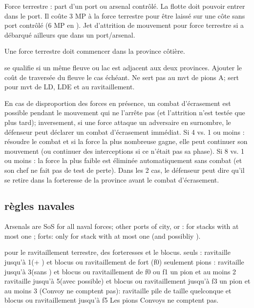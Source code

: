 Force terrestre : part d'un port ou arsenal
contrôlé.  La flotte doit pouvoir entrer dans le port.
\bparag Il coûte 3 MP à la force terrestre pour être laissé sur une côte
sans port contrôlé (6 MP en \ROTW).
\bparag Jet d'attrition de mouvement pour force terrestre si a débarqué
ailleurs que dans un port/arsenal.

Une force terrestre doit commencer dans la province côtière.

se qualifie si un même fleuve ou lac est adjacent
aux deux provinces. Ajouter le coût de traversée du
fleuve le cas échéant.
\bparag Ne sert pas au mvt de pions A; sert pour mvt de LD, LDE
et au ravitaillement.

En cas de disproportion des forces en présence, un combat d'écrasement est possible
pendant le mouvement qui ne l'arrête pas (et l'attrition n'est testée que plus tard);
inversement, si une force attaque un adversaire en surnombre, le défenseur
peut déclarer un combat d'écrasement immédiat.
\bparag Si 4 \LD vs. 1 \LD ou moins :  résoudre le combat et si la force la
plus nombreuse gagne, elle peut continuer son mouvement (ou continuer des
interceptions si ce n'était pas sa phase).
\bparag Si 8 \LD vs. 1 \LD ou moins : la force la plus faible est éliminée automatiquement
sans combat (et son chef ne fait pas de test de perte).
\bparag Dans les 2 cas, le défenseur peut dire qu'il se retire dans la forteresse
de la province avant le combat d'écrasement.


\subsection{règles navales}

Arsenals are SoS for all naval forces; other ports of city, \COL or \TP: for
stacks with at most one \FLEET; forts: only for stack with at most one \ND
(and possibliy \NDE).

 pour le ravitaillement terrestre, des
forteresses et le blocus.
\bparag \de seuls : ravitaille jusqu'à 1\DT (+ \LDE) et blocus ou ravitaillement de fort (f0) seulement
\bparag pions \DN : ravitaille jusqu'à 3\DT (sans \ARMY) et blocus ou ravitaillement de f0 ou f1
\bparag un pion \FLEET et au moins 2 \ND ravitaille jusqu'à 5\DT (avec \ARMY possible) et blocus ou ravitaillement jusqu'à f3
\bparag un pion \FLEET\faceplus et au moins 3 \ND (Convoy ne comptent pas): ravitaille pile
de taille quelconque et blocus ou ravitaillement jusqu'à f5
\bparag Les pions Convoys ne comptent pas.

